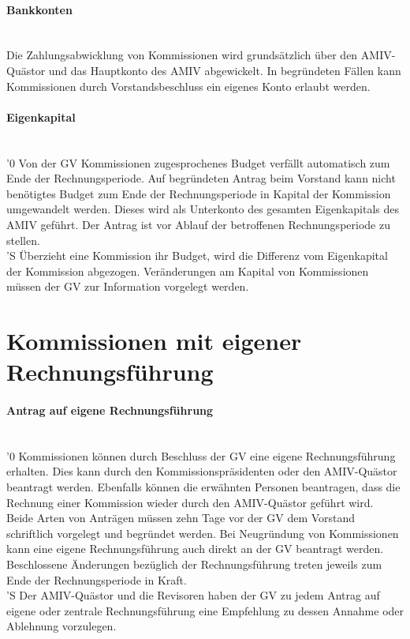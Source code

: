\documentclass[a4paper,11pt]{article}
\newcommand{\nl}{\\[1.5ex]}
\begin{document}
\paragraph{Bankkonten} \ \\
Die Zahlungsabwicklung von Kommissionen wird grundsätzlich über den AMIV-Quästor und das Hauptkonto des AMIV abgewickelt. In begründeten Fällen kann Kommissionen durch Vorstandsbeschluss ein eigenes Konto erlaubt werden.


\paragraph{Eigenkapital} \ \\
'0 Von der GV Kommissionen zugesprochenes Budget verfällt automatisch zum Ende der Rechnungsperiode. Auf begründeten Antrag beim Vorstand kann nicht benötigtes Budget zum Ende der Rechnungsperiode in Kapital der Kommission umgewandelt werden. Dieses wird als Unterkonto des gesamten Eigenkapitals des AMIV geführt. Der Antrag ist vor Ablauf der betroffenen Rechnungsperiode zu stellen.\nl
'S Überzieht eine Kommission ihr Budget, wird die Differenz vom Eigenkapital der Kommission abgezogen. Veränderungen am Kapital von Kommissionen müssen der GV zur Information vorgelegt werden.


\section*{Kommissionen mit eigener Rechnungsführung}
\paragraph{Antrag auf eigene Rechnungsführung} \ \\
'0 Kommissionen können durch Beschluss der GV eine eigene Rechnungsführung erhalten. Dies kann durch den Kommissionspräsidenten oder den AMIV-Quästor beantragt werden. Ebenfalls können die erwähnten Personen beantragen, dass die Rechnung einer Kommission wieder durch den AMIV-Quästor geführt wird. Beide Arten von Anträgen müssen zehn Tage vor der GV dem Vorstand schriftlich vorgelegt und begründet werden. Bei Neugründung von Kommissionen kann eine eigene Rechnungsführung auch direkt an der GV beantragt werden. Beschlossene Änderungen bezüglich der Rechnungsführung treten jeweils zum Ende der Rechnungsperiode in Kraft.\nl
'S Der AMIV-Quästor und die Revisoren haben der GV zu jedem Antrag auf eigene oder zentrale Rechnungsführung eine Empfehlung zu dessen Annahme oder Ablehnung vorzulegen.
\end{document}
